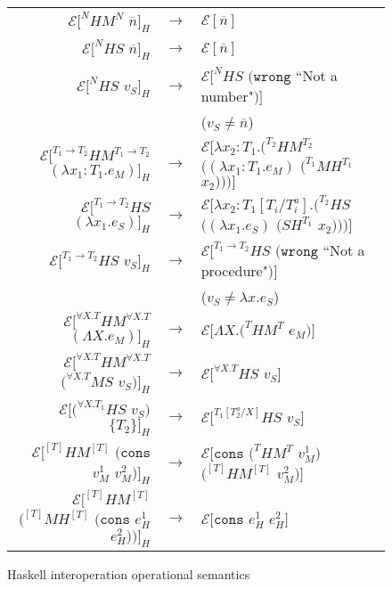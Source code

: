 \begin{figure}[p]
\label{hios}
\caption{Haskell interoperation operational semantics}
\begin{center}
\begin{tabular}{rcl}
$\mathscr{E}[^{N}HM^{N}$ $\overline{n}]_{H}$ & $\rightarrow$ & $\mathscr{E}[\overline{n}]$ \\
$\mathscr{E}[^{N}HS$ $\overline{n}]_{H}$ & $\rightarrow$ & $\mathscr{E}[\overline{n}]$ \\
$\mathscr{E}[^{N}HS$ $v_{S}]_{H}$ & $\rightarrow$ & $\mathscr{E}[^{N}HS$ $(\mathtt{wrong}$ ``Not a number"$)]$ \\
&& ($v_{S}\neq\overline{n}$) \\
$\mathscr{E}[^{T_{1}\rightarrow T_{2}}HM^{T_{1}\rightarrow T_{2}}$ $(\lambda x_{1}:T_{1}.e_{M})]_{H}$ & $\rightarrow$ & $\mathscr{E}[\lambda x_{2}:T_{1}.(^{T_{2}}HM^{T_{2}}$ $((\lambda x_{1}:T_{1}.e_{M})$ $(^{T_{1}}MH^{T_{1}}$ $x_{2})))]$ \\
$\mathscr{E}[^{T_{1}\rightarrow T_{2}}HS$ $(\lambda x_{1}.e_{S})]_{H}$ & $\rightarrow$ & $\mathscr{E}[\lambda x_{2}:T_{1}[T_{i}/T^{a}_{i}].(^{T_{2}}HS$ $((\lambda x_{1}.e_{S})$ $(SH^{T_{1}}$ $x_{2})))]$ \\
$\mathscr{E}[^{T_{1}\rightarrow T_{2}}HS$ $v_{S}]_{H}$ & $\rightarrow$ & $\mathscr{E}[^{T_{1}\rightarrow T_{2}}HS$ $(\mathtt{wrong}$ ``Not a procedure"$)]$ \\
&& ($v_{S}\neq\lambda x.e_{S}$) \\
$\mathscr{E}[^{\forall X.T}HM^{\forall X.T}$ $(\Lambda X.e_{M})]_{H}$ & $\rightarrow$ & $\mathscr{E}[\Lambda X.(^{T}HM^{T}$ $e_{M})]$ \\
$\mathscr{E}[^{\forall X.T}HM^{\forall X.T}$ $(^{\forall X.T}MS$ $v_{S})]_{H}$ & $\rightarrow$ & $\mathscr{E}[^{\forall X.T}HS$ $v_{S}]$ \\
$\mathscr{E}[(^{\forall X.T_{1}}HS$ $v_{S})$ $\lbrace T_{2}\rbrace]_{H}$ & $\rightarrow$ & $\mathscr{E}[^{T_{1}[T^{a}_{2}/X]}HS$ $v_{S}]$ \\
$\mathscr{E}[^{[T]}HM^{[T]}$ $(\mathtt{cons}$ $v_{M}^{1}$ $v_{M}^{2})]_{H}$ & $\rightarrow$ & $\mathscr{E}[\mathtt{cons}$ $(^{T}HM^{T}$ $v_{M}^{1})$ $(^{[T]}HM^{[T]}$ $v_{M}^{2})]$ \\
$\mathscr{E}[^{[T]}HM^{[T]}$ $(^{[T]}MH^{[T]}$ $(\mathtt{cons}$ $e_{H}^{1}$ $e_{H}^{2}))]_{H}$ & $\rightarrow$ & $\mathscr{E}[\mathtt{cons}$ $e_{H}^{1}$ $e_{H}^{2}]$ \\

\end{tabular}
\end{center}
\end{figure}
